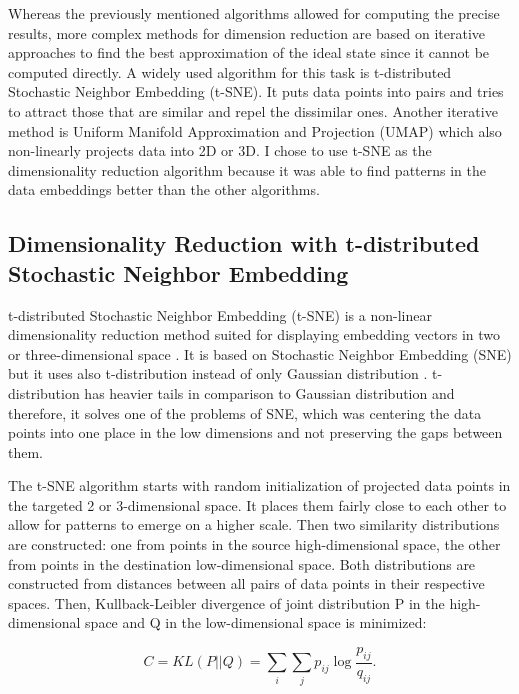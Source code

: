 Whereas the previously mentioned algorithms allowed for computing the precise results, more complex methods for dimension reduction are based on iterative approaches to find the best approximation of the ideal state since it cannot be computed directly. A widely used algorithm for this task is t-distributed Stochastic Neighbor Embedding (t-SNE). It puts data points into pairs and tries to attract those that are similar and repel the dissimilar ones. Another iterative method is Uniform Manifold Approximation and Projection (UMAP) which also non-linearly projects data into 2D or 3D. I chose to use t-SNE as the dimensionality reduction algorithm because it was able to find patterns in the data embeddings better than the other algorithms.

\subsection{Dimensionality Reduction with t-distributed Stochastic Neighbor Embedding}

t-distributed Stochastic Neighbor Embedding (t-SNE) is a non-linear dimensionality reduction method suited for displaying embedding vectors in two or three-dimensional space \cite{tsne-vandermaaten08a}. It is based on Stochastic Neighbor Embedding (SNE) but it uses also t-distribution instead of only Gaussian distribution \cite{sne-NIPS2002_6150ccc6}. t-distribution has heavier tails in comparison to Gaussian distribution and therefore, it solves one of the problems of SNE, which was centering the data points into one place in the low dimensions and not preserving the gaps between them.

The t-SNE algorithm starts with random initialization of projected data points in the targeted 2 or 3-dimensional space. It places them fairly close to each other to allow for patterns to emerge on a higher scale. Then two similarity distributions are constructed: one from points in the source high-dimensional space, the other from points in the destination low-dimensional space. Both distributions are constructed from distances between all pairs of data points in their respective spaces. Then, Kullback-Leibler divergence of joint distribution P in the high-dimensional space and Q in the low-dimensional space is minimized:

\begin{equation}
    \label{eq:tsne-kl}
    C = KL(P||Q) = \sum \limits_{i} \sum \limits_{j} p_{i j} \log \frac{p_{i j}}{q_{i j}}.
\end{equation}

